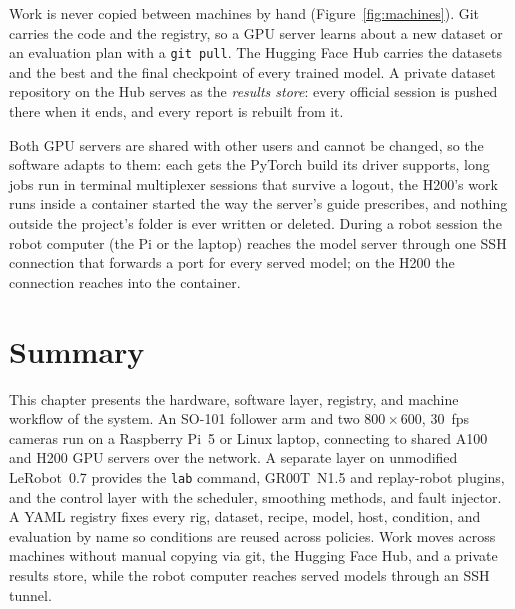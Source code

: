 Work is never copied between machines by hand (Figure~\ref{fig:machines}). Git carries the code and the registry, so a
GPU server learns about a new dataset or an evaluation plan with a \texttt{git pull}. The Hugging Face Hub carries the
datasets and the best and the final checkpoint of every trained model. A private dataset repository on the Hub serves as the
\emph{results store}: every official session is pushed there when it ends, and every report is rebuilt from it.

Both GPU servers are shared with other users and cannot be changed, so the software adapts to them: each gets the
PyTorch build its driver supports, long jobs run in terminal multiplexer sessions that survive a logout, the H200's
work runs inside a container started the way the server's guide prescribes, and nothing outside the project's folder
is ever written or deleted. During a robot session the robot computer (the Pi or the laptop) reaches the model server through one SSH connection
that forwards a port for every served model; on the H200 the connection reaches into the container.

\section{Summary}
This chapter presents the hardware, software layer, registry, and machine workflow of the system. An SO-101 follower arm and two $800\times600$, 30~fps cameras run on a Raspberry Pi~5 or Linux laptop, connecting to shared A100 and H200 GPU servers over the network. A separate layer on unmodified LeRobot~0.7 provides the \texttt{lab} command, GR00T~N1.5 and replay-robot plugins, and the control layer with the \drtc{} scheduler, smoothing methods, and fault injector. A YAML registry fixes every rig, dataset, recipe, model, host, condition, and evaluation by name so conditions are reused across policies. Work moves across machines without manual copying via git, the Hugging Face Hub, and a private results store, while the robot computer reaches served models through an SSH tunnel.
